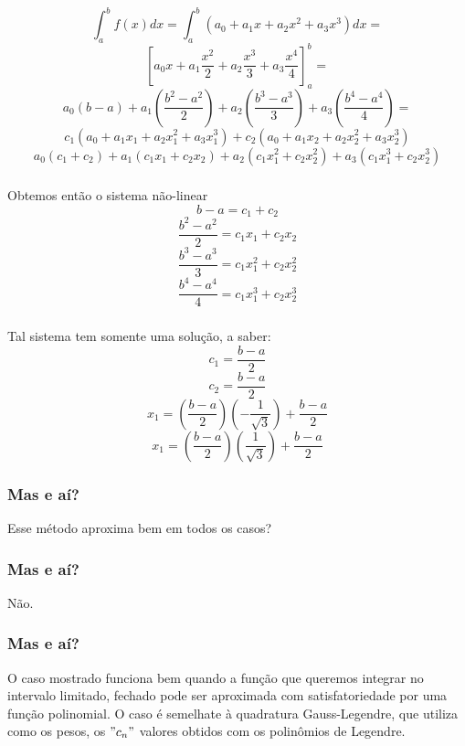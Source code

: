 \documentclass{beamer}
\begin{document}
\begin{frame}
\frametitle{}
    $$\int_a^b {f(x)dx} = \int_a^b {\left( a_0 + a_1x + a_2x^2 + a_3x^3 \right)dx} = $$
    $$ \left[ a_0x + a_1 \dfrac{x^2}{2} +  a_2 \dfrac{x^3}{3} +  a_3 \dfrac{x^4}{4} \right]_a^b = $$ 
    $$a_0 (b-a) + a_1 \left( \dfrac{b^2 - a^2}{2}\right) + a_2 \left( \dfrac{b^3 - a^3}{3}\right) + a_3 \left( \dfrac{b^4 - a^4}{4}\right) = $$
    $$ c_1 \left( a_0 + a_1x_1 + a_2x_1^2 + a_3x_1^3 \right) + c_2 \left( a_0 + a_1x_2 + a_2x_2^2 + a_3x_2^3 \right) $$
    $$ a_0 \left( c_1 + c_2 \right) +  a_1 \left( c_1x_1 + c_2x_2 \right) + a_2 \left( c_1x_1^2 + c_2x_2^2 \right) +  a_3 \left( c_1x_1^3 + c_2x_2^3 \right) $$
\end{frame}

\begin{frame}
\frametitle{}
Obtemos então o sistema não-linear
    $$ b - a = c_1 + c_2$$
    $$ \dfrac{b^2 - a^2}{2} = c_1x_1 + c_2x_2$$
    $$ \dfrac{b^3 - a^3}{3} = c_1x_1^2 + c_2x_2^2$$
    $$ \dfrac{b^4 - a^4}{4} = c_1x_1^3 + c_2x_2^3$$
\end{frame}

\begin{frame}
\frametitle{}
    Tal sistema tem somente uma solução, a saber:
    $$ c_1 = \frac{b-a}{2} $$
    $$ c_2 = \frac{b-a}{2} $$
    $$ x_1 = \left( \frac{b-a}{2} \right) \left( -\frac{1}{\sqrt{3}}\right) + \frac{b-a}{2} $$
    $$ x_1 = \left( \frac{b-a}{2} \right) \left( \frac{1}{\sqrt{3}}\right) + \frac{b-a}{2} $$
\end{frame}

\begin{frame}
\frametitle{Mas e aí?}
Esse método aproxima bem em todos os casos?
\end{frame}
\begin{frame}
\frametitle{Mas e aí?}
Não. 
\end{frame}

\begin{frame}
\frametitle{Mas e aí?}
O caso mostrado funciona bem quando a função que queremos integrar no intervalo limitado, fechado pode ser aproximada
com satisfatoriedade por uma função polinomial. O caso é semelhate à quadratura Gauss-Legendre, 
que utiliza como os pesos, os $"c_n"$ valores obtidos com os polinômios de Legendre.
\end{frame}
\end{document}
